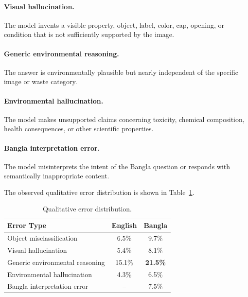 \documentclass{article}
\begin{document}
\paragraph{Visual hallucination.}
The model invents a visible property, object, label, color, cap, opening, or condition that is not sufficiently supported by the image.

\paragraph{Generic environmental reasoning.}
The answer is environmentally plausible but nearly independent of the specific image or waste category.

\paragraph{Environmental hallucination.}
The model makes unsupported claims concerning toxicity, chemical composition, health consequences, or other scientific properties.

\paragraph{Bangla interpretation error.}
The model misinterprets the intent of the Bangla question or responds with semantically inappropriate content.

The observed qualitative error distribution is shown in Table~\ref{tab:error_distribution}.

\begin{table}[t]
\centering
\caption{Qualitative error distribution. }
\label{tab:error_distribution}
\begin{tabular}{lcc}
\toprule
\textbf{Error Type}
& \textbf{English}
& \textbf{Bangla} \\
\midrule
Object misclassification
& 6.5\%
& 9.7\% \\

Visual hallucination
& 5.4\%
& 8.1\% \\

Generic environmental reasoning
& 15.1\%
& \textbf{21.5\%} \\

Environmental hallucination
& 4.3\%
& 6.5\% \\

Bangla interpretation error
& --
& 7.5\% \\
\bottomrule
\end{tabular}
\end{table}
\end{document}
